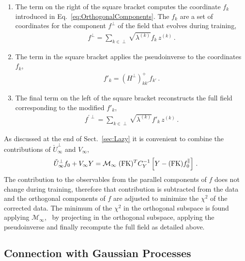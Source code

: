 \begin{enumerate}
    \item The term on the right of the square bracket computes the coordinate
    $f_k$ introduced in Eq.~\eqref{eq:OrthogonalComponents}. The $f_k$ are a set
    of coordinates for the component $f^\perp$ of the field that evolves during
    training, 
    \begin{align}
        \label{eq:RightOfTheBracket}
        f^\perp = \sum_{k\in\perp} \sqrt{\lambda^{(k)}} f_k\, z^{(k)}\,  .
    \end{align}
    \item The term in the square bracket applies the pseudoinverse to the
    coordinates $f_k$, 
    \begin{align}
        \label{eq:ApplyPseudoInv}
        f'_k = \left(H^\perp\right)^+_{kk'} f_{k'}\, .
    \end{align}
    \item The final term on the left of the square bracket reconstructs the full
    field corresponding to the modified $f'_{k}$,
    \begin{align}
        \label{eq:LeftOfTheBracket}
        f^{'\perp} = \sum_{k\in\perp} \sqrt{\lambda^{(k)}} f'_{k}\, z^{(k)}\, .
    \end{align}
    
\end{enumerate}

As discussed at the end of Sect.~\ref{sec:Lazy} it is convenient to combine the
contributions of $\check{U}^\perp_{\infty}$ and $V_{\infty}$,
\begin{align}
    \label{eq:DataCorrectedInferenceAtInfty}
    \check{U}^{\perp}_{\infty} f_{0} + V_{\infty} Y 
        = \mathcal{M}_{\infty}\; (\mathrm{FK})^T C_Y^{-1} \left[Y - (\mathrm{FK}) f_{0}^{\parallel}\right]\, .
\end{align}
The contribution to the observables from the parallel components of $f$ does not
change during training, therefore that contribution is subtracted from the data
and the orthogonal components of $f$ are adjusted to minimize the $\chi^2$ of
the corrected data. The minimum of the $\chi^2$ in the orthogonal subspace is
found applying $\mathcal{M}_{\infty}$, \ie\ by projecting in the orthogonal
subspace, applying the pseudoinverse and finally recompute the full field as
detailed above.


\subsection{Connection with Gaussian Processes}

